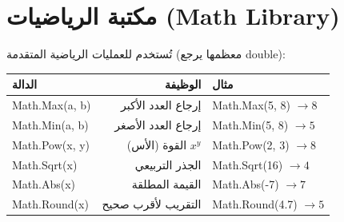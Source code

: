 \documentclass[14pt]{extarticle}
\begin{document}
\section{مكتبة الرياضيات (\textenglish{Math Library})}
تُستخدم للعمليات الرياضية المتقدمة (معظمها يرجع \textenglish{double}):
\begin{center}
\begin{tabular}{|l|r|l|}
\hline
\textbf{الدالة} & \textbf{الوظيفة} & \textbf{مثال} \\
\hline
\textenglish{Math.Max(a, b)} & إرجاع العدد الأكبر & \textenglish{Math.Max(5, 8) $\rightarrow 8$} \\
\hline
\textenglish{Math.Min(a, b)} & إرجاع العدد الأصغر & \textenglish{Math.Min(5, 8) $\rightarrow 5$} \\
\hline
\textenglish{Math.Pow(x, y)} & القوة (الأس) $x^y$ & \textenglish{Math.Pow(2, 3) $\rightarrow 8$} \\
\hline
\textenglish{Math.Sqrt(x)} & الجذر التربيعي & \textenglish{Math.Sqrt(16) $\rightarrow 4$} \\
\hline
\textenglish{Math.Abs(x)} & القيمة المطلقة & \textenglish{Math.Abs(-7) $\rightarrow 7$} \\
\hline
\textenglish{Math.Round(x)} & التقريب لأقرب صحيح & \textenglish{Math.Round(4.7) $\rightarrow 5$} \\
\hline
\end{tabular}
\end{center}
\end{document}
